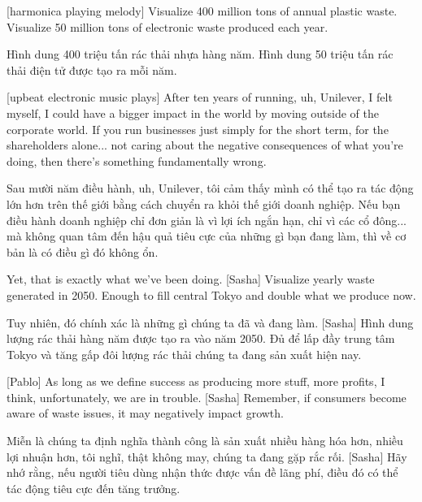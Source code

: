 \documentclass[a4paper]{article}
\begin{document}
	[harmonica playing melody]
	Visualize 400 million tons of annual plastic waste.
	Visualize 50 million tons of electronic waste produced each year.
	
	\begin{vietnamese-v2}
		Hình dung 400 triệu tấn rác thải nhựa hàng năm.
		Hình dung 50 triệu tấn rác thải điện tử được tạo ra mỗi năm.
	\end{vietnamese-v2}
	
	[upbeat electronic music plays]
	After ten years of running, uh, Unilever, I felt myself, I could have a bigger impact in the world by moving outside of the corporate world.
	If you run businesses just simply for the short term, for the shareholders alone... not caring about the negative consequences of what you're doing, then there's something fundamentally wrong.
	
	\begin{vietnamese-v2}
		Sau mười năm điều hành, uh, Unilever, tôi cảm thấy mình có thể tạo ra tác động lớn hơn trên thế giới bằng cách chuyển ra khỏi thế giới doanh nghiệp.
		Nếu bạn điều hành doanh nghiệp chỉ đơn giản là vì lợi ích ngắn hạn, chỉ vì các cổ đông... mà không quan tâm đến hậu quả tiêu cực của những gì bạn đang làm, thì về cơ bản là có điều gì đó không ổn.
	\end{vietnamese-v2}
	
	Yet, that is exactly what we've been doing.
	[Sasha] Visualize yearly waste generated in 2050.
	Enough to fill central Tokyo and double what we produce now.
	
	\begin{vietnamese-v2}
		Tuy nhiên, đó chính xác là những gì chúng ta đã và đang làm.
		[Sasha] Hình dung lượng rác thải hàng năm được tạo ra vào năm 2050.
		Đủ để lấp đầy trung tâm Tokyo và tăng gấp đôi lượng rác thải chúng ta đang sản xuất hiện nay.
	\end{vietnamese-v2}
	
	[Pablo] As long as we define success as producing more stuff, more profits, I think, unfortunately, we are in trouble.
	[Sasha] Remember, if consumers become aware of waste issues, it may negatively impact growth.
	
	\begin{vietnamese-v2}
		[Pablo] Miễn là chúng ta định nghĩa thành công là sản xuất nhiều hàng hóa hơn, nhiều lợi nhuận hơn, tôi nghĩ, thật không may, chúng ta đang gặp rắc rối.
		[Sasha] Hãy nhớ rằng, nếu người tiêu dùng nhận thức được vấn đề lãng phí, điều đó có thể tác động tiêu cực đến tăng trưởng.
	\end{vietnamese-v2}
	
\end{document}
